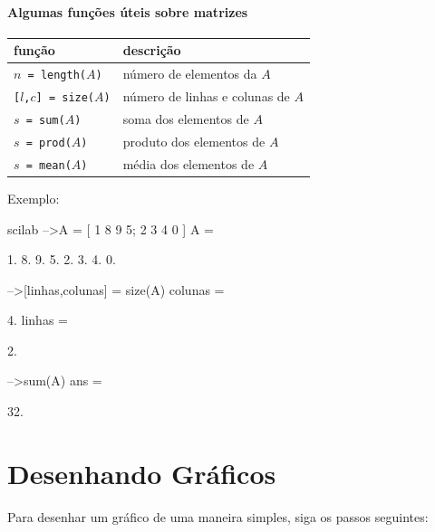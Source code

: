 \documentclass[11pt,fleqn]{practice}
\begin{document}
\paragraph{Algumas funções úteis sobre matrizes}

\begin{center}
  \begin{tabular}{ll} \hline
    \textbf{função} & \textbf{descrição} \\\hline
    \texttt{$n$ = length($A$)} & número de elementos da $A$ \\\hline
    \texttt{[$l$,$c$] = size($A$)} & número de linhas e colunas de $A$ \\\hline
    \texttt{$s$ = sum($A$)} & soma dos elementos de $A$ \\\hline
    \texttt{$s$ = prod($A$)} & produto dos elementos de $A$ \\\hline
    \texttt{$s$ = mean($A$)} & média dos elementos de $A$ \\\hline
  \end{tabular}
\end{center}

Exemplo:
\begin{lst}{scilab}
-->A = [ 1 8 9 5; 2 3 4 0 ]
 A  =
 
    1.    8.    9.    5.  
    2.    3.    4.    0.  
 
-->[linhas,colunas] = size(A)
 colunas  =
 
    4.  
 linhas  =
 
    2.  

-->sum(A)
 ans  =

    32.
\end{lst}


\section{Desenhando Gráficos}

Para desenhar um gráfico de uma maneira simples, siga os passos
seguintes:
\end{document}
